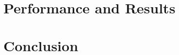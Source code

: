 \documentclass[fleqn,12pt]{olplainarticle}
\begin{document}
\section{Performance and Results}\label{sec:results}

\section{Conclusion} \label{sec:conclussion}








    
    
    
\end{document}
